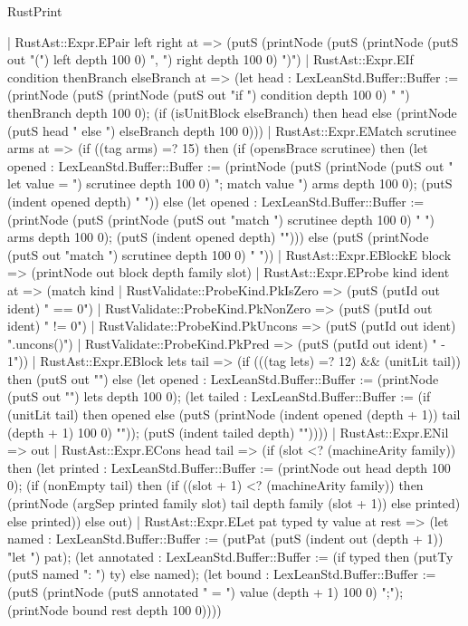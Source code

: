 \begin{lexlean}{RustPrint}
\begin{semanticmodule}
{    | RustAst::Expr.EPair left right at => (putS (printNode (putS (printNode (putS out "(") left depth 100 0) ", ") right depth 100 0) ")")
    | RustAst::Expr.EIf condition thenBranch elseBranch at => (let head : LexLeanStd.Buffer::Buffer := (printNode (putS (printNode (putS out "if ") condition depth 100 0) " ") thenBranch depth 100 0); (if (isUnitBlock elseBranch) then head else (printNode (putS head " else ") elseBranch depth 100 0)))
    | RustAst::Expr.EMatch scrutinee arms at => (if ((tag arms) =? 15) then (if (opensBrace scrutinee) then (let opened : LexLeanStd.Buffer::Buffer := (printNode (putS (printNode (putS out "{ let value = ") scrutinee depth 100 0) "; match value {\n") arms depth 100 0); (putS (indent opened depth) "} }")) else (let opened : LexLeanStd.Buffer::Buffer := (printNode (putS (printNode (putS out "match ") scrutinee depth 100 0) " {\n") arms depth 100 0); (putS (indent opened depth) "}"))) else (putS (printNode (putS out "match ") scrutinee depth 100 0) " {}"))
    | RustAst::Expr.EBlockE block => (printNode out block depth family slot)
    | RustAst::Expr.EProbe kind ident at => (match kind
      | RustValidate::ProbeKind.PkIsZero => (putS (putId out ident) " == 0")
      | RustValidate::ProbeKind.PkNonZero => (putS (putId out ident) " != 0")
      | RustValidate::ProbeKind.PkUncons => (putS (putId out ident) ".uncons()")
      | RustValidate::ProbeKind.PkPred => (putS (putId out ident) " - 1"))
    | RustAst::Expr.EBlock lets tail => (if (((tag lets) =? 12) && (unitLit tail)) then (putS out "{}") else (let opened : LexLeanStd.Buffer::Buffer := (printNode (putS out "{\n") lets depth 100 0); (let tailed : LexLeanStd.Buffer::Buffer := (if (unitLit tail) then opened else (putS (printNode (indent opened (depth + 1)) tail (depth + 1) 100 0) "\n")); (putS (indent tailed depth) "}"))))
    | RustAst::Expr.ENil => out
    | RustAst::Expr.ECons head tail => (if (slot <? (machineArity family)) then (let printed : LexLeanStd.Buffer::Buffer := (printNode out head depth 100 0); (if (nonEmpty tail) then (if ((slot + 1) <? (machineArity family)) then (printNode (argSep printed family slot) tail depth family (slot + 1)) else printed) else printed)) else out)
    | RustAst::Expr.ELet pat typed ty value at rest => (let named : LexLeanStd.Buffer::Buffer := (putPat (putS (indent out (depth + 1)) "let ") pat); (let annotated : LexLeanStd.Buffer::Buffer := (if typed then (putTy (putS named ": ") ty) else named); (let bound : LexLeanStd.Buffer::Buffer := (putS (printNode (putS annotated " = ") value (depth + 1) 100 0) ";\n"); (printNode bound rest depth 100 0))))
}
\end{semanticmodule}
\end{lexlean}
